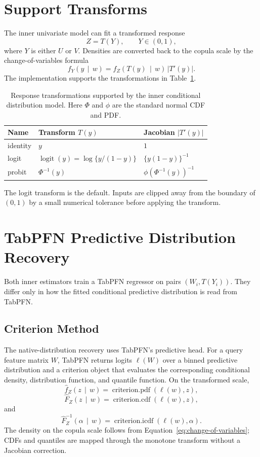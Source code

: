 \documentclass[11pt]{article}
\newcommand{\given}{\,\mid\,}
\newcommand{\logit}{\operatorname{logit}}
\begin{document}
\section{Support Transforms}

The inner univariate model can fit a transformed response
\[
  Z = T(Y),
  \qquad Y \in (0,1),
\]
where $Y$ is either $U$ or $V$. Densities are converted back to the
copula scale by the change-of-variables formula
\[
  f_Y(y \given w)
  =
  f_Z(T(y) \given w)\,\left|T'(y)\right|.
  \label{eq:change-of-variables}
\]
The implementation supports the transformations in
Table~\ref{tab:transforms}.

\begin{table}[h]
  \centering
  \begin{tabular}{lll}
    \toprule
    Name & Transform $T(y)$ & Jacobian $\left|T'(y)\right|$ \\
    \midrule
    identity & $y$ & $1$ \\
    logit & $\logit(y)=\log\{y/(1-y)\}$ & $\{y(1-y)\}^{-1}$ \\
    probit & $\Phi^{-1}(y)$ & $\phi(\Phi^{-1}(y))^{-1}$ \\
    \bottomrule
  \end{tabular}
  \caption{Response transformations supported by the inner conditional
  distribution model. Here $\Phi$ and $\phi$ are the standard normal CDF
  and PDF.}
  \label{tab:transforms}
\end{table}

The logit transform is the default. Inputs are clipped away from the
boundary of $(0,1)$ by a small numerical tolerance before applying the
transform.

\section{TabPFN Predictive Distribution Recovery}

Both inner estimators train a TabPFN regressor on pairs
$(W_i,T(Y_i))$. They differ only in how the fitted conditional
predictive distribution is read from TabPFN.

\subsection{Criterion Method}

The native-distribution recovery uses TabPFN's predictive head. For a query
feature matrix $W$, TabPFN returns logits $\ell(W)$ over a binned
predictive distribution and a criterion object that evaluates the
corresponding conditional density, distribution function, and quantile
function. On the transformed scale,
\[
  \widehat f_Z(z \given w)
  =
  \operatorname{criterion.pdf}(\ell(w), z),
\]
\[
  \widehat F_Z(z \given w)
  =
  \operatorname{criterion.cdf}(\ell(w), z),
\]
and
\[
  \widehat F_Z^{-1}(\alpha \given w)
  =
  \operatorname{criterion.icdf}(\ell(w), \alpha).
\]
The density on the copula scale follows from
Equation~\eqref{eq:change-of-variables}; CDFs and quantiles are mapped
through the monotone transform without a Jacobian correction.
\end{document}
